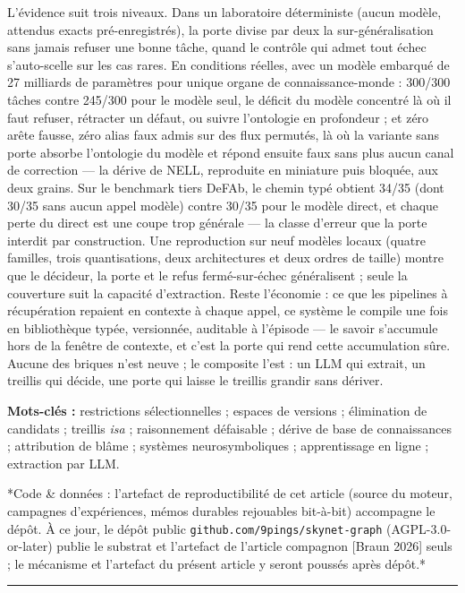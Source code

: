 \documentclass[11pt]{article}
\begin{document}
L'évidence suit trois niveaux. Dans un laboratoire déterministe (aucun modèle, attendus exacts pré-enregistrés), la porte divise par deux la sur-généralisation sans jamais refuser une bonne tâche, quand le contrôle qui admet tout échec s'auto-scelle sur les cas rares. En conditions réelles, avec un modèle embarqué de 27 milliards de paramètres pour unique organe de connaissance-monde : 300/300 tâches contre 245/300 pour le modèle seul, le déficit du modèle concentré là où il faut refuser, rétracter un défaut, ou suivre l'ontologie en profondeur ; et zéro arête fausse, zéro alias faux admis sur des flux permutés, là où la variante sans porte absorbe l'ontologie du modèle et répond ensuite faux sans plus aucun canal de correction — la dérive de NELL, reproduite en miniature puis bloquée, aux deux grains. Sur le benchmark tiers DeFAb, le chemin typé obtient 34/35 (dont 30/35 sans aucun appel modèle) contre 30/35 pour le modèle direct, et chaque perte du direct est une coupe trop générale — la classe d'erreur que la porte interdit par construction. Une reproduction sur neuf modèles locaux (quatre familles, trois quantisations, deux architectures et deux ordres de taille) montre que le décideur, la porte et le refus fermé-sur-échec généralisent ; seule la couverture suit la capacité d'extraction. Reste l'économie : ce que les pipelines à récupération repaient en contexte à chaque appel, ce système le compile une fois en bibliothèque typée, versionnée, auditable à l'épisode — le savoir s'accumule hors de la fenêtre de contexte, et c'est la porte qui rend cette accumulation sûre. Aucune des briques n'est neuve ; le composite l'est : un LLM qui extrait, un treillis qui décide, une porte qui laisse le treillis grandir sans dériver.

\textbf{Mots-clés :} restrictions sélectionnelles ; espaces de versions ; élimination de candidats ; treillis \emph{isa} ; raisonnement défaisable ; dérive de base de connaissances ; attribution de blâme ; systèmes neurosymboliques ; apprentissage en ligne ; extraction par LLM.

*Code \& données : l'artefact de reproductibilité de cet article (source du moteur, campagnes d'expériences, mémos durables rejouables bit-à-bit) accompagne le dépôt. À ce jour, le dépôt public \texttt{github.com/\allowbreak{}9pings/\allowbreak{}skynet-graph} (AGPL-3.0-or-later) publie le substrat et l'artefact de l'article compagnon [Braun 2026] seuls ; le mécanisme et l'artefact du présent article y seront poussés après dépôt.*

\medskip\hrule\medskip
\end{document}
